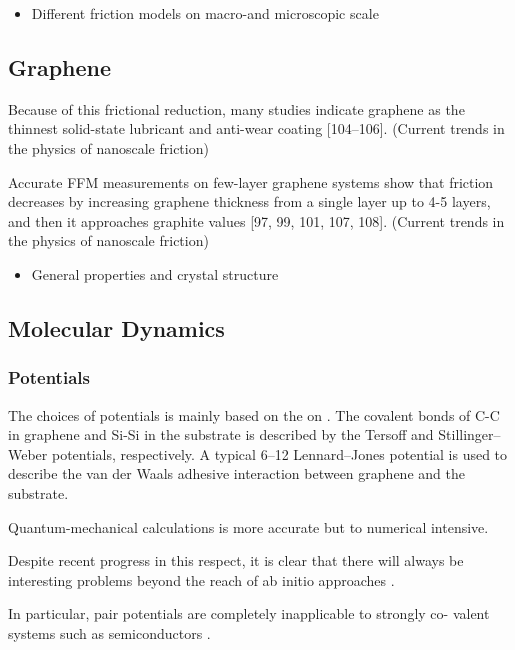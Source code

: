 \begin{itemize}
  \item Different friction models on macro-and microscopic scale
\end{itemize}
\subsection{Graphene}
Because of this frictional reduction, many studies indicate graphene as the thinnest solid-state lubricant and anti-wear coating [104–106].
(Current trends in the physics of nanoscale friction)


Accurate FFM measurements on few-layer graphene systems show that friction decreases by increasing graphene thickness from a single layer up
to 4-5 layers, and then it approaches graphite values [97, 99, 101, 107, 108]. (Current trends in the physics of nanoscale friction)



\begin{itemize}
  \item General properties and crystal structure
\end{itemize}
\subsection{Molecular Dynamics}



\subsubsection{Potentials}
The choices of potentials is mainly based on the on \cite{li_evolving_2016}. The covalent bonds of C-C in graphene and Si-Si in the substrate is described by the Tersoff and Stillinger–Weber potentials, respectively. A typical 6–12 Lennard–Jones potential is used to describe the van der Waals adhesive interaction between graphene and the substrate. 


Quantum-mechanical calculations is more accurate but to numerical intensive.


Despite recent progress in this respect, it is clear that there will always be interesting problems beyond the reach of ab initio approaches \cite{PhysRevB.37.6991}.

In particular, pair potentials are completely inapplicable to strongly co- valent systems such as semiconductors \cite{PhysRevB.37.6991}.

